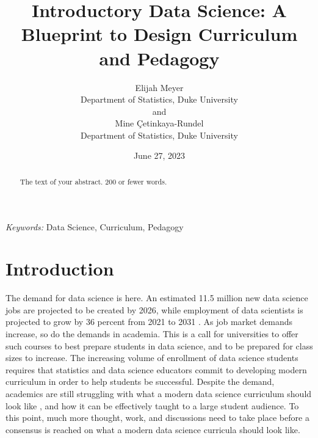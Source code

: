 \documentclass[
  12pt]{article}
\begin{document}
\def\spacingset#1{\renewcommand{\baselinestretch}%
{#1}\small\normalsize} \spacingset{1}



\date{June 27, 2023}
\title{\bf Introductory Data Science: A Blueprint to Design Curriculum
and Pedagogy}
\author{
Elijah Meyer\\
Department of Statistics, Duke University\\
and\\Mine Çetinkaya-Rundel\\
Department of Statistics, Duke University\\
}
\maketitle

\bigskip
\bigskip
\begin{abstract}
The text of your abstract. 200 or fewer words.
\end{abstract}

\noindent%
{\it Keywords:} Data Science, Curriculum, Pedagogy
\vfill

\newpage
\spacingset{1.9} %
\ifdefined\Shaded\renewenvironment{Shaded}{\begin{tcolorbox}[borderline west={3pt}{0pt}{shadecolor}, interior hidden, boxrule=0pt, breakable, enhanced, frame hidden, sharp corners]}{\end{tcolorbox}}\fi

\hypertarget{introduction}{%
\section{Introduction}\label{introduction}}

The demand for data science is here. An estimated 11.5 million new data
science jobs are projected to be created by 2026, while employment of
data scientists is projected to grow by 36 percent from 2021 to 2031
\citep{labor_2022}. As job market demands increase, so do the demands in
academia. This is a call for universities to offer such courses to best
prepare students in data science, and to be prepared for class sizes to
increase. The increasing volume of enrollment of data science students
\citep{Redmond2022} requires that statistics and data science educators
commit to developing modern curriculum in order to help students be
successful. Despite the demand, academics are still struggling with what
a modern data science curriculum should look like \citep{Schwab2020},
and how it can be effectively taught to a large student audience. To
this point, much more thought, work, and discussions need to take place
before a consensus is reached on what a modern data science curricula
should look like.
\end{document}
